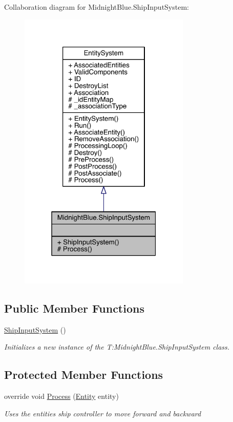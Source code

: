 Collaboration diagram for Midnight\+Blue.\+Ship\+Input\+System\+:\nopagebreak
\begin{figure}[H]
\begin{center}
\leavevmode
\includegraphics[width=232pt]{class_midnight_blue_1_1_ship_input_system__coll__graph}
\end{center}
\end{figure}
\subsection*{Public Member Functions}
\begin{DoxyCompactItemize}
\item 
\hyperlink{class_midnight_blue_1_1_ship_input_system_ad7f804f91939a651c8e53ddb6bf55db6}{Ship\+Input\+System} ()
\begin{DoxyCompactList}\small\item\em Initializes a new instance of the T\+:\+Midnight\+Blue.\+Ship\+Input\+System class. \end{DoxyCompactList}\end{DoxyCompactItemize}
\subsection*{Protected Member Functions}
\begin{DoxyCompactItemize}
\item 
override void \hyperlink{class_midnight_blue_1_1_ship_input_system_ac504beb5b6afa47ca4618d9683e46946}{Process} (\hyperlink{class_m_b2_d_1_1_entity_component_1_1_entity}{Entity} entity)
\begin{DoxyCompactList}\small\item\em Uses the entities ship controller to move forward and backward \end{DoxyCompactList}\end{DoxyCompactItemize}

